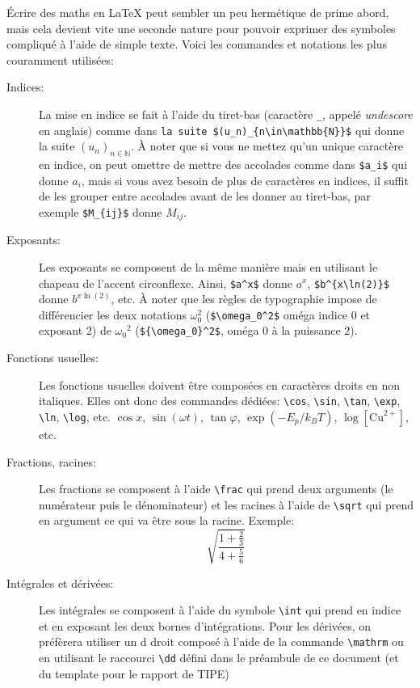 \documentclass[12pt,a4paper]{article}
\newcommand{\ofg}[1]{\og{}#1\fg{}}
\newcommand{\cmd}[1]{\texttt{\textbackslash#1}}
\begin{document}
Écrire des maths en \LaTeX{} peut sembler un peu hermétique de prime abord, mais cela devient vite une seconde nature pour pouvoir exprimer des symboles compliqué à l'aide de simple texte. Voici les commandes et notations les plus couramment utilisées:
\begin{description}
	
    \item[Indices:] La mise en indice se fait à l'aide du \ofg{tiret-bas} (caractère \texttt{\_}, appelé \emph{undescore} en anglais) comme dans \verb|la suite $(u_n)_{n\in\mathbb{N}}$| qui donne \ofg{la suite $(u_n)_{n\in\mathbb{N}}$}. À noter que si vous ne mettez qu'un unique caractère en indice, on peut omettre de mettre des accolades comme dans \verb|$a_i$| qui donne $a_i$, mais si vous avez besoin de plus de caractères en indices, il suffit de les grouper entre accolades avant de les donner au tiret-bas, par exemple \verb|$M_{ij}$| donne $M_{ij}$.
   	
    \item[Exposants:] Les exposants se composent de la même manière mais en utilisant le chapeau de l'accent circonflexe. Ainsi, \verb|$a^x$| donne $a^x$, \verb|$b^{x\ln(2)}$| donne $b^{x\ln(2)}$, etc. À noter que les règles de typographie impose de différencier les deux notations $\omega_0^2$ (\verb|$\omega_0^2$| oméga indice 0 et exposant 2) de ${\omega_0}^2$ (\verb|${\omega_0}^2$|, oméga 0 à la puissance 2).
    
    \item[Fonctions usuelles:] Les fonctions usuelles doivent être composées en caractères droits en non italiques. Elles ont donc des commandes dédiées: \cmd{cos}, \cmd{sin}, \cmd{tan}, \cmd{exp}, \cmd{ln}, \cmd{log}, etc. $\cos x$, $\sin(\omega t)$, $\tan\varphi$, $\exp(-E_p/k_BT)$, $\log[\mathrm{Cu}^{2+}]$, etc.
    
    \item[Fractions, racines:] Les fractions se composent à l'aide \cmd{frac} qui prend deux arguments (le numérateur puis le dénominateur) et les racines à l'aide de \cmd{sqrt} qui prend en argument ce qui va être sous la racine. Exemple: $$\sqrt{\frac{1 + \frac{2}{3}}{4 + \frac{5}{6}}}$$
    
    \item[Intégrales et dérivées:] Les intégrales se composent à l'aide du symbole \cmd{int} qui prend en indice et en exposant les deux bornes d'intégrations. Pour les dérivées, on préfèrera utiliser un \ofg{d droit} composé à l'aide de la commande \cmd{mathrm} ou en utilisant le raccourci \cmd{dd} défini dans le préambule de ce document (et du template pour le rapport de TIPE)
    

\end{description}
\end{document}
